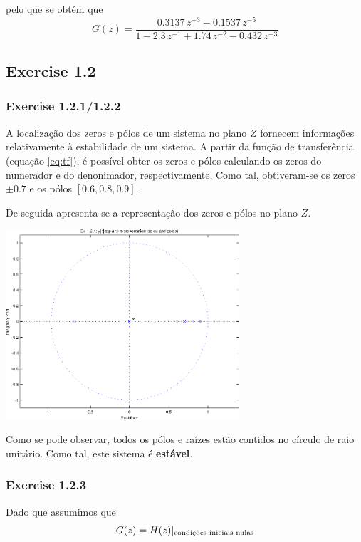\documentclass[a4paper]{article}
\begin{document}
\noindent pelo que se obtém que
\begin{equation}
	\label{eq:tf}
	G(z) = \frac{0.3137 \, z^{-3} - 0.1537 \, z^{-5}}{1 - 2.3 \, z^{-1} + 1.74 \, z^{-2} - 0.432 \, z^{-3}}
\end{equation}

\subsection{Exercise 1.2}
\subsubsection{Exercise 1.2.1/1.2.2}
\noindent A localização dos zeros e pólos de um sistema no plano $Z$ fornecem informações relativamente à estabilidade de um sistema. A partir da função de transferência (equação \ref{eq:tf}), é possível obter os zeros e pólos calculando os zeros do numerador e do denonimador, respectivamente. Como tal, obtiveram-se os zeros $\pm 0.7$ e os pólos $[0.6, 0.8, 0.9]$.

\noindent De seguida apresenta-se a representação dos zeros e pólos no plano $Z$.
\begin{center}
	\includegraphics[width=0.65\textwidth]{images/ex1_2_1.png}
	\label{fig:ex1_2_1_zplane}
\end{center}

\noindent Como se pode observar, todos os pólos e raízes estão contidos no círculo de raio unitário. Como tal, este sistema é \textbf{estável}.

\subsubsection{Exercise 1.2.3}
\noindent Dado que assumimos que
\begin{equation}
	G(z) = H(z)|_{\text{condições iniciais nulas}} \\
\end{equation}
\end{document}
